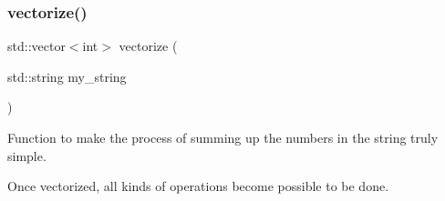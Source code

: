 \subsubsection{vectorize()}
{\footnotesize\ttfamily std\+::vector$<$int$>$ vectorize (\begin{DoxyParamCaption}\item[{std\+::string}]{my\+\_\+string }\end{DoxyParamCaption})}



Function to make the process of summing up the numbers in the string truly simple. 

Once vectorized, all kinds of operations become possible to be done. 